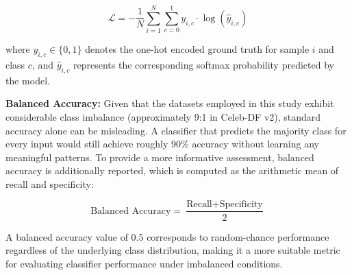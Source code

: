 \begin{equation}
\mathcal{L} = -\frac{1}{N} \sum_{i=1}^{N} \sum_{c=0}^{1} y_{i,c} \cdot \log(\hat{y}_{i,c})
\end{equation}

\noindent where $y_{i,c} \in \{0, 1\}$ denotes the one-hot encoded ground truth for sample $i$ and class $c$, and $\hat{y}_{i,c}$ represents the corresponding softmax probability predicted by the model.




\vspace{5mm}

\textbf{Balanced Accuracy:} Given that the datasets employed in this study exhibit considerable class imbalance (approximately 9:1 in Celeb-DF v2), standard accuracy alone can be misleading. A classifier that predicts the majority class for every input would still achieve roughly 90\% accuracy without learning any meaningful patterns. To provide a more informative assessment, balanced accuracy is additionally reported, which is computed as the arithmetic mean of recall and specificity:

\vspace{5mm}

\begin{equation}
\text{Balanced Accuracy} = \frac{\text{Recall} + \text{Specificity}}{2}
\end{equation}

\noindent A balanced accuracy value of 0.5 corresponds to random-chance performance regardless of the underlying class distribution, making it a more suitable metric for evaluating classifier performance under imbalanced conditions.




